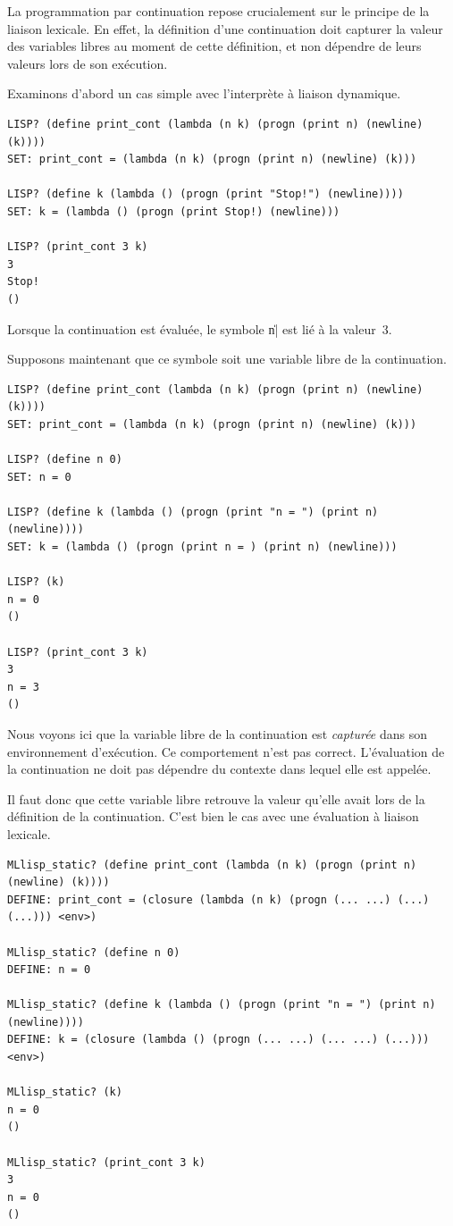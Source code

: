 \documentclass{../../LaTeX/tdsimple}
\begin{document}
La programmation par continuation repose crucialement sur le principe
de la liaison lexicale. En effet, la définition d'une continuation
doit capturer la valeur des variables libres au moment de cette
définition, et non dépendre de leurs valeurs lors de son exécution.

Examinons d'abord un cas simple avec l'interprète à liaison dynamique.
\begin{lstlisting}
LISP? (define print_cont (lambda (n k) (progn (print n) (newline) (k))))
SET: print_cont = (lambda (n k) (progn (print n) (newline) (k)))

LISP? (define k (lambda () (progn (print "Stop!") (newline))))
SET: k = (lambda () (progn (print Stop!) (newline)))

LISP? (print_cont 3 k)
3
Stop!
()
\end{lstlisting}
Lorsque la continuation est évaluée, le symbole \|n| est lié à la
valeur~3.

Supposons maintenant que ce symbole soit une variable libre de la
continuation.
\begin{lstlisting}
LISP? (define print_cont (lambda (n k) (progn (print n) (newline) (k))))
SET: print_cont = (lambda (n k) (progn (print n) (newline) (k)))

LISP? (define n 0)
SET: n = 0

LISP? (define k (lambda () (progn (print "n = ") (print n) (newline))))
SET: k = (lambda () (progn (print n = ) (print n) (newline)))

LISP? (k)
n = 0
()

LISP? (print_cont 3 k)
3
n = 3
()
\end{lstlisting}
Nous voyons ici que la variable libre de la continuation est
\emph{capturée} dans son environnement d'exécution. Ce comportement
n'est pas correct. L'évaluation de la continuation ne doit pas
dépendre du contexte dans lequel elle est appelée.

Il faut donc que cette variable libre retrouve la valeur qu'elle avait
lors de la définition de la continuation. C'est bien le cas avec une
évaluation à liaison lexicale.
\begin{lstlisting}
MLlisp_static? (define print_cont (lambda (n k) (progn (print n) (newline) (k))))
DEFINE: print_cont = (closure (lambda (n k) (progn (... ...) (...) (...))) <env>)

MLlisp_static? (define n 0)
DEFINE: n = 0

MLlisp_static? (define k (lambda () (progn (print "n = ") (print n) (newline))))
DEFINE: k = (closure (lambda () (progn (... ...) (... ...) (...))) <env>)

MLlisp_static? (k)
n = 0
()

MLlisp_static? (print_cont 3 k)
3
n = 0
()
\end{lstlisting}
\end{document}
